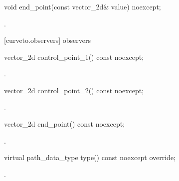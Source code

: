 \begin{itemdecl}
    void end_point(const vector_2d& value) noexcept;
\end{itemdecl}
\begin{itemdescr}
	\pnum
	\postconditions
	.
	
\end{itemdescr}

 [curveto.observers]{ observers}

\begin{itemdecl}
    vector_2d control_point_1() const noexcept;
\end{itemdecl}
\begin{itemdescr}
	\pnum
	\returns
	.

\end{itemdescr}

\begin{itemdecl}
    vector_2d control_point_2() const noexcept;
\end{itemdecl}
\begin{itemdescr}
	\pnum
	\returns
	.

\end{itemdescr}

\begin{itemdecl}
    vector_2d end_point() const noexcept;
\end{itemdecl}
\begin{itemdescr}
	\pnum
	\returns
	.

\end{itemdescr}

\begin{itemdecl}
    virtual path_data_type type() const noexcept override;
\end{itemdecl}
\begin{itemdescr}
	\pnum
	\returns
	.

\end{itemdescr}

